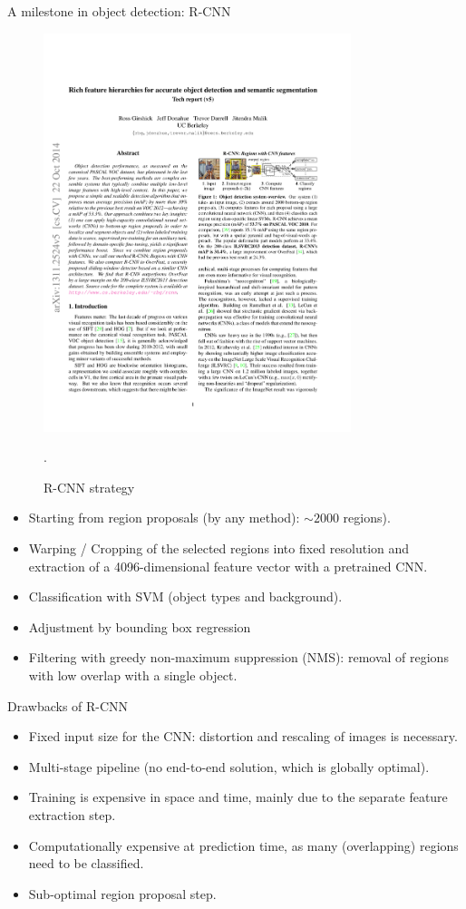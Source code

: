 \documentclass[xcolor=pdftex,dvipsnames,table]{beamer}
\begin{document}
\begin{frame}{A milestone in object detection: R-CNN}
\begin{figure}[htb]
   \centering
   \includegraphics[width=0.8\textwidth]{../graphics/R-CNN.pdf}
   \caption{R-CNN strategy \cite{Girshick2014}}.
\end{figure}
\begin{itemize}
	\item Starting from region proposals (by any method): $\sim 2000$ regions). 
	\item Warping / Cropping of the selected regions into fixed resolution and extraction of a 4096-dimensional feature vector with a pretrained CNN. 
	\item Classification with SVM (object types and background). 
	\item Adjustment by bounding box regression
	\item Filtering with greedy non-maximum suppression (NMS): removal of regions with low overlap with a single object. 
\end{itemize}
\end{frame}

\begin{frame}{Drawbacks of R-CNN}
\begin{itemize}
\item Fixed input size for the CNN: distortion and rescaling of images is necessary.
\item Multi-stage pipeline (no end-to-end solution, which is globally optimal).
\item Training is expensive in space and time, mainly due to the separate feature extraction step. 
\item Computationally expensive at prediction time, as many (overlapping) regions need to be classified. 
\item Sub-optimal region proposal step.
\end{itemize} 
\end{frame}
\end{document}
